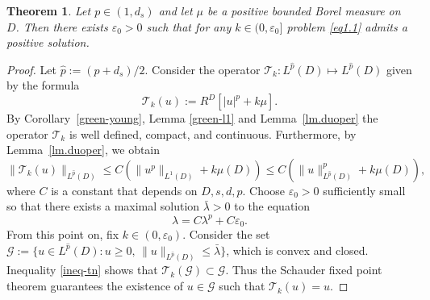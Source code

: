\documentclass[11pt,a4paper,reqno]{amsart}
\newtheorem{theorem}{\bf Theorem}[section]
\theoremstyle{definition}
\numberwithin{equation}{section}
\begin{document}
\begin{theorem}\label{exist-sol}
Let $p\in(1,{d_s})$ and let $\mu$ be a positive bounded Borel measure on $D$. Then there exists $\varepsilon_0>0$ such that for any $k \in(0,\varepsilon_0]$ 
problem  \eqref{eq1.1} admits a positive solution.
\end{theorem}
\begin{proof}
Let  $\hat{p}:=(p+{d_s})/2$.
Consider the operator $\mathcal{T}_k:L^{\hat p}(D)\mapsto L^{\hat p}(D)$ 
given by the formula 
\[
\mathcal{T}_k(u):=R^D[|u|^p+k\mu].
\]
By Corollary~\ref{green-young}, Lemma \ref{green-l1} and Lemma~\ref{lm.duoper} the operator  $\mathcal T_k$
is well defined, compact, and  continuous.
Furthermore, by Lemma~\ref{lm.duoper}, we obtain
\begin{equation}
\label{ineq-tn}
\|\mathcal{T}_k(u)\|_{L^{\hat{p}}(D)}\leq C(\|u^p\|_{L^1(D)}+k\mu(D))\leq C(\|u\|^p_{L^{\hat p}(D)}+k\mu(D)),
\end{equation}
where $C$ is a constant that depends on $D,s,d,p$.
Choose $\varepsilon_0>0$ sufficiently small so that there exists a maximal solution $\bar{\lambda}>0$ to the equation
\[
\lambda=C\lambda^p+C\varepsilon_0.
\]
From this point on, fix $k\in(0,\varepsilon_0)$. Consider the set
$\mathcal{G}:=\{u\in L^{\hat p}(D): u\ge0,\, \|u\|_{L^{\hat{p}}(D)}\leq \bar{\lambda}\}$,
which is convex and closed. 
Inequality \eqref{ineq-tn} shows that $\mathcal{T}_k(\mathcal{G})\subset \mathcal{G}$. 
Thus the Schauder fixed point theorem guarantees the existence of $u\in \mathcal{G}$
such that $\mathcal T_k(u)=u$. 
\end{proof}
\end{document}
